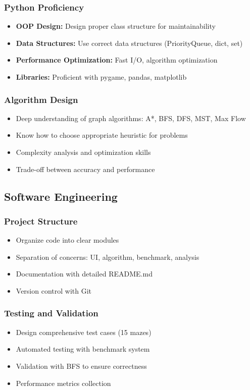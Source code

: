 \documentclass[12pt,a4paper]{article}
\begin{document}
\subsubsection{Python Proficiency}
\begin{itemize}
    \item \textbf{OOP Design:} Design proper class structure for maintainability
    \item \textbf{Data Structures:} Use correct data structures (PriorityQueue, dict, set)
    \item \textbf{Performance Optimization:} Fast I/O, algorithm optimization
    \item \textbf{Libraries:} Proficient with pygame, pandas, matplotlib
\end{itemize}

\subsubsection{Algorithm Design}
\begin{itemize}
    \item Deep understanding of graph algorithms: A*, BFS, DFS, MST, Max Flow
    \item Know how to choose appropriate heuristic for problems
    \item Complexity analysis and optimization skills
    \item Trade-off between accuracy and performance
\end{itemize}

\subsection{Software Engineering}

\subsubsection{Project Structure}
\begin{itemize}
    \item Organize code into clear modules
    \item Separation of concerns: UI, algorithm, benchmark, analysis
    \item Documentation with detailed README.md
    \item Version control with Git
\end{itemize}

\subsubsection{Testing and Validation}
\begin{itemize}
    \item Design comprehensive test cases (15 mazes)
    \item Automated testing with benchmark system
    \item Validation with BFS to ensure correctness
    \item Performance metrics collection
\end{itemize}
\end{document}
